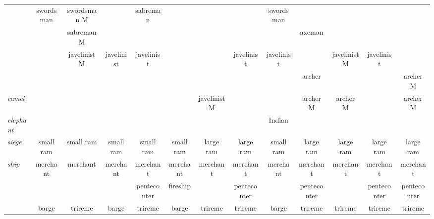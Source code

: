 \documentclass{article}
\begin{document}
\begin{landscape}
\begin{tabular}{l||c|c|c|c||c|c|c|c||c|c|c|c}
 & swordsman      & swordsman M    &                & sabreman       &                &                &                & swordsman      &                &                &                &                \\
 &                & sabreman M     &                &                &                &                &                &                & axeman         &                &                &                \\
 &                & javelinist M   & javelinist     & javelinist     &                &                & javelinist     & javelinist     &                & javelinist M   & javelinist     &                \\
 &                &                &                &                &                &                &                &                & archer         &                &                & archer M       \\
\hline\textit{camel}
 &                &                &                &                &                & javelinist M   &                &                & archer M       & archer M       &                & archer M       \\
\hline\textit{elephant}
 &                &                &                &                &                &                &                & Indian         &                &                &                &                \\
\hline\textit{siege} 
 & small ram      & small ram      & small ram      & small ram      & small ram      & large ram      & large ram      & small ram      & large ram      & large ram      & large ram      & large ram      \\
\hline\textit{ship}
 & merchant       & merchant       & merchant       & merchant       & merchant       & merchant       & merchant       & merchant       & merchant       & merchant       & merchant       & merchant       \\
 &                &                &                & penteconter    & fireship       &                & penteconter    &                & penteconter    &                & penteconter    & penteconter    \\
 & barge          & trireme        & barge          & trireme        & barge          & trireme        & trireme        & barge          & trireme        & trireme        & trireme        & trireme        \\


\end{tabular}
\end{landscape}
\end{document}

